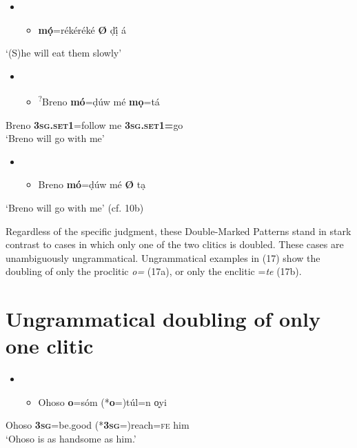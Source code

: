 \documentclass[output=paper]{langsci/langscibook}
\begin{document}
\begin{itemize}
\item \setcounter{itemize}{0}
\begin{itemize}
\item \gll \textbf{mọ́}=rékéréké \textbf{Ø} ḍị́ á\\
\end{itemize}
\end{itemize}
\glt ‘(S)he will eat them slowly’
\z

\begin{itemize}
\item \setcounter{itemize}{0}
\begin{itemize}
\item \gll \textsuperscript{?}Breno  \textbf{mó}=ḍúw    mé   \textbf{mọ}=tá    \\
\end{itemize}
\end{itemize}
     Breno     \textbf{\textsc{3sg.set1}}=follow  me  \textbf{\textsc{3sg.set1=}}go\\
\glt ‘Breno will go with me’
\z

\begin{itemize}
\item \setcounter{itemize}{0}
\begin{itemize}
\item \gll Breno \textbf{mó}=ḍúw mé \textbf{Ø} tạ\\
\end{itemize}
\end{itemize}
\glt ‘Breno will go with me’ (cf. 10b)
\z

Regardless of the specific judgment, these Double-Marked Patterns stand in stark contrast to cases in which only one of the two clitics is doubled. These cases are unambiguously ungrammatical. Ungrammatical examples in (17) show the doubling of only the proclitic \textit{o=} (17a), or only the enclitic =\textit{te }(17b). 

\chapter[Ungrammatical doubling of only one clitic]{Ungrammatical doubling of only one clitic}
\label{bkm:Ref448217188}\begin{itemize}
\item \setcounter{itemize}{0}
\begin{itemize}
\item \gll Ohoso \textbf{  o}=sóm       (*\textbf{o}=)túl=n       o̩yi\\
\end{itemize}
\end{itemize}
       Ohoso  \textbf{\textsc{3sg}}=be.good   (*\textbf{\textsc{3sg}}=)reach=\textsc{fe  }   him\\
\glt ‘Ohoso is as handsome as him.’
\z
\end{document}
